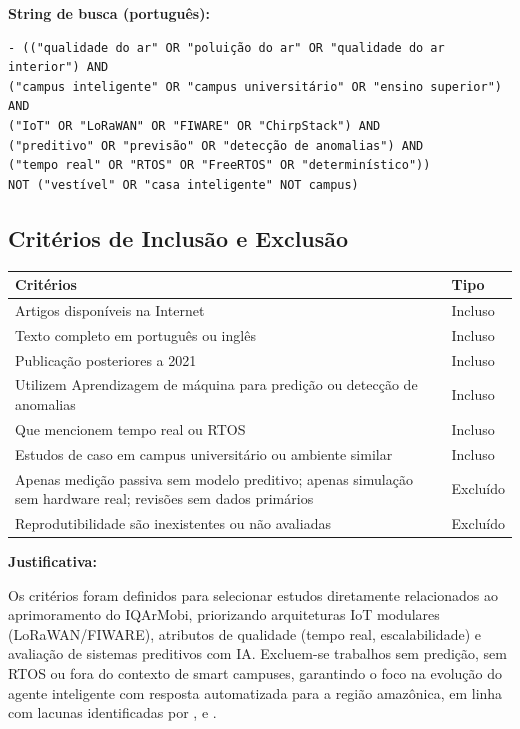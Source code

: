 \vspace{0.3cm}
\noindent \textbf{String de busca (português):}
\begin{verbatim}
- (("qualidade do ar" OR "poluição do ar" OR "qualidade do ar interior") AND
("campus inteligente" OR "campus universitário" OR "ensino superior") AND
("IoT" OR "LoRaWAN" OR "FIWARE" OR "ChirpStack") AND
("preditivo" OR "previsão" OR "detecção de anomalias") AND
("tempo real" OR "RTOS" OR "FreeRTOS" OR "determinístico"))
NOT ("vestível" OR "casa inteligente" NOT campus)
\end{verbatim}



\newpage
\subsection{Critérios de Inclusão e Exclusão}

\begin{table}[ht]
\centering
\begin{tabular}{|p{10cm}|p{5cm}|}
\hline
\textbf{Critérios} & \textbf{Tipo} \\
\hline
Artigos disponíveis na Internet
& Incluso\\
\hline
Texto completo em português ou inglês
& Incluso\\
\hline
Publicação posteriores a 2021
& Incluso\\
\hline
Utilizem Aprendizagem de máquina para predição ou detecção de anomalias
& Incluso\\
\hline
Que mencionem tempo real ou RTOS
& Incluso\\
\hline
Estudos de caso em campus universitário ou ambiente similar
& Incluso\\
\hline
Apenas medição passiva sem modelo preditivo; apenas simulação sem hardware real; revisões sem dados primários
& Excluído\\
\hline
Reprodutibilidade são inexistentes ou não avaliadas
& Excluído\\
\hline

\end{tabular}
\end{table}

\noindent \textbf{Justificativa:}

Os critérios foram definidos para selecionar estudos diretamente
relacionados ao aprimoramento do IQArMobi, priorizando arquiteturas
IoT modulares (LoRaWAN/FIWARE), atributos de qualidade
(tempo real, escalabilidade) e avaliação de sistemas preditivos
com IA. Excluem-se trabalhos sem predição, sem RTOS ou fora do
contexto de smart campuses, garantindo o foco na evolução do agente inteligente com resposta automatizada para a 
região amazônica, em linha com lacunas identificadas por \textcite{mokrani2019}, \textcite{wang2023} e \textcite{benammar2018}.

